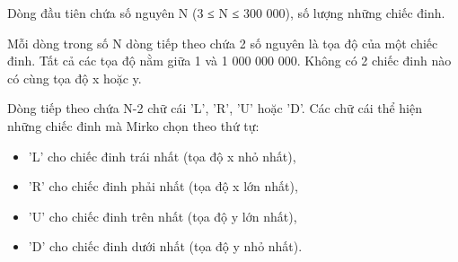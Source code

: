 Dòng đầu tiên chứa số nguyên N (3 ≤ N ≤ 300 000), số lượng những chiếc đinh.  

   Mỗi dòng trong số N dòng tiếp theo chứa 2 số nguyên là tọa độ của một chiếc đinh. Tất cả các tọa độ nằm giữa 1 và 1 000 000 000. Không có 2 chiếc đinh nào có cùng tọa độ x hoặc y.  

   Dòng tiếp theo chứa N-2 chữ cái 'L', 'R', 'U' hoặc 'D'. Các chữ cái thể hiện những chiếc đinh mà Mirko chọn theo thứ tự:  
\begin{itemize}
	\item     'L' cho chiếc đinh trái nhất (tọa độ x nhỏ nhất),   
	\item     'R' cho chiếc đinh phải nhất (tọa độ x lớn nhất),   
	\item     'U' cho chiếc đinh trên nhất (tọa độ y lớn nhất),   
	\item     'D' cho chiếc đinh dưới nhất (tọa độ y nhỏ nhất).   
\end{itemize}

\